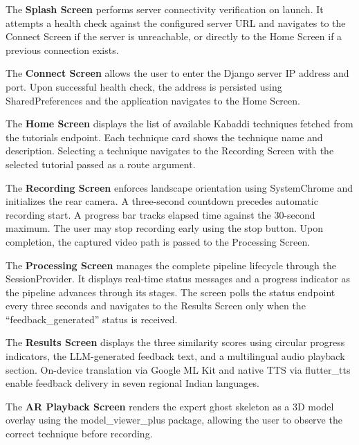 \begin{sloppypar}
The \textbf{Splash Screen} performs server connectivity verification on launch. It attempts a health check against the configured server URL and navigates to the Connect Screen if the server is unreachable, or directly to the Home Screen if a previous connection exists.

The \textbf{Connect Screen} allows the user to enter the Django server IP address and port. Upon successful health check, the address is persisted using SharedPreferences and the application navigates to the Home Screen.

The \textbf{Home Screen} displays the list of available Kabaddi techniques fetched from the tutorials endpoint. Each technique card shows the technique name and description. Selecting a technique navigates to the Recording Screen with the selected tutorial passed as a route argument.

The \textbf{Recording Screen} enforces landscape orientation using SystemChrome and initializes the rear camera. A three-second countdown precedes automatic recording start. A progress bar tracks elapsed time against the 30-second maximum. The user may stop recording early using the stop button. Upon completion, the captured video path is passed to the Processing Screen.

The \textbf{Processing Screen} manages the complete pipeline lifecycle through the SessionProvider. It displays real-time status messages and a progress indicator as the pipeline advances through its stages. The screen polls the status endpoint every three seconds and navigates to the Results Screen only when the ``feedback\_generated'' status is received.

The \textbf{Results Screen} displays the three similarity scores using circular progress indicators, the LLM-generated feedback text, and a multilingual audio playback section. On-device translation via Google ML Kit and native TTS via flutter\_tts enable feedback delivery in seven regional Indian languages.

The \textbf{AR Playback Screen} renders the expert ghost skeleton as a 3D model overlay using the model\_viewer\_plus package, allowing the user to observe the correct technique before recording.


\end{sloppypar}
